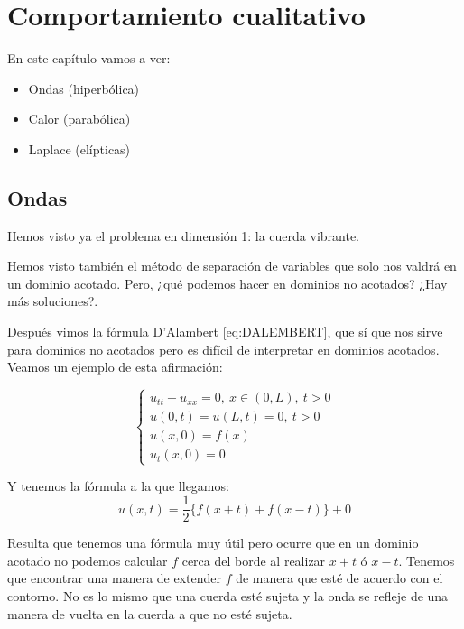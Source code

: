 \chapter{Comportamiento cualitativo}


En este capítulo vamos a ver:

\begin{itemize}

	\item Ondas (hiperbólica)
	\item Calor (parabólica)
	\item Laplace (elípticas)

\end{itemize}


\section{Ondas}

	Hemos visto ya el problema en dimensión 1: la cuerda vibrante.

	Hemos visto también el método de separación de variables que solo nos valdrá en un dominio acotado. Pero, ¿qué podemos hacer en dominios no acotados? ¿Hay más soluciones?.

	Después vimos la fórmula D'Alambert \eqref{eq:DALEMBERT}, que sí que nos sirve para dominios no acotados pero es difícil de interpretar en dominios acotados. Veamos un ejemplo de esta afirmación:

	\begin{example}

		\[\begin{cases}
			u_{tt} - u_{xx} = 0, \ x \in (0,L), \ t > 0 \\
			u(0,t) = u(L,t) = 0, \ t > 0\\
			u(x,0) = f(x) \\
			u_t(x,0) = 0
		\end{cases}\]

		Y tenemos la fórmula a la que llegamos:
		\[ u(x,t) = \frac{1}{2} \{f(x+t)+f(x-t)\} + 0  \]

		Resulta que tenemos una fórmula muy útil pero ocurre que en un dominio acotado no podemos calcular $f$ cerca del borde al realizar $x+t$ ó $x-t$. Tenemos que encontrar una manera de extender $f$ de manera que esté de acuerdo con el contorno. No es lo mismo que una cuerda esté sujeta y la onda se refleje de una manera de vuelta en la cuerda a que no esté sujeta.

		\begin{center}
		\end{center}

	\end{example}

